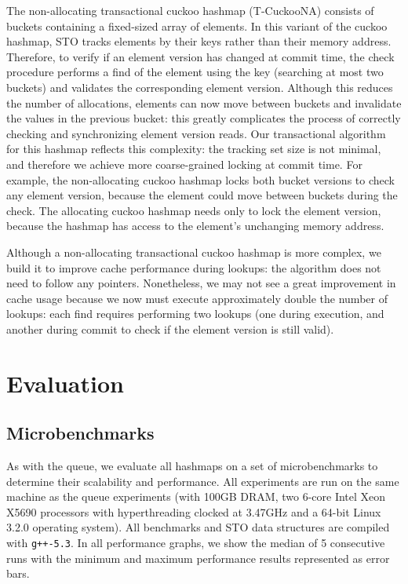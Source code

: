 The non-allocating transactional cuckoo hashmap (T-CuckooNA) consists of buckets containing a fixed-sized array of elements. In this variant of the cuckoo hashmap, STO tracks elements by their keys rather than their memory address. Therefore, to verify if an element version has changed at commit time, the check procedure performs a find of the element using the key (searching at most two buckets) and validates the corresponding element version. Although this reduces the number of allocations, elements can now move between buckets and invalidate the values in the previous bucket: this greatly complicates the process of correctly checking and synchronizing element version reads. Our transactional algorithm for this hashmap reflects this complexity: the tracking set size is not minimal, and therefore we achieve more coarse-grained locking at commit time. For example, the non-allocating cuckoo hashmap locks both bucket versions to check any element version, because the element could move between buckets during the check. The allocating cuckoo hashmap needs only to lock the element version, because the hashmap has access to the element's unchanging memory address. 

Although a non-allocating transactional cuckoo hashmap is more complex, we build it to improve cache performance during lookups: the algorithm does not need to follow any pointers. Nonetheless, we may not see a great improvement in cache usage because we now must execute approximately double the number of lookups: each find requires performing two lookups (one during execution, and another during commit to check if the element version is still valid).

\section{Evaluation}

\subsection{Microbenchmarks}
As with the queue, we evaluate all hashmaps on a set of microbenchmarks to determine their scalability and performance. All experiments are run on the same machine as the queue experiments (with 100GB DRAM, two 6-core Intel Xeon X5690 processors with hyperthreading clocked at 3.47GHz and a 64-bit Linux 3.2.0 operating system). All benchmarks and STO data structures are compiled with \texttt{g++-5.3}. In all performance graphs, we show the median of 5 consecutive runs with the minimum and maximum performance results represented as error bars.

